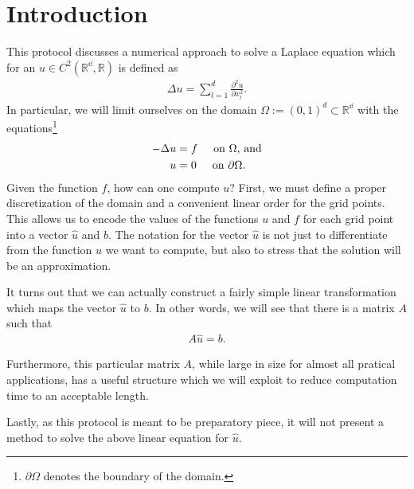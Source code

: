 \section{Introduction}

This protocol discusses a numerical approach to solve a Laplace equation which for an \(u \in C^2(\mathbb{R^d}, \mathbb{R})\) is defined as
\begin{align*}
	\Delta u = \sum^{d}_{l = 1} \frac{\partial^2 u}{\partial x_l^2} \text{.}
\end{align*}
In particular, we will limit ourselves on the domain \( \Omega := (0, 1)^d \subset \mathbb{R^d} \) with the equations\footnote{\(\partial \Omega\) denotes the boundary of the domain.}
\begin{align*}
	- \Delta u &= f \hspace{0.5cm} \text{on } \Omega \text{, and} \\
	u &= 0 \hspace{0.5cm} \text{on } \partial \Omega \text{.}
\end{align*}
Given the function \(f\), how can one compute \(u\)? First, we must define a proper discretization of the domain and a convenient linear order for the grid points. This allows us to encode the values of the functions \(u\) and \(f\) for each grid point into a vector \(\hat{u}\) and \(b\). The notation for the vector \(\hat{u}\) is not just to differentiate from the function \(u\) we want to compute, but also to stress that the solution will be an approximation.

It turns out that we can actually construct a fairly simple linear transformation which maps the vector \(\hat{u}\) to \(b\). In other words, we will see that there is a matrix \(A\) such that
\begin{align*}
	A \hat{u} = b \text{.}
\end{align*}

Furthermore, this particular matrix \(A\), while large in size for almost all pratical applications, has a useful structure which we will exploit to reduce computation time to an acceptable length.

Lastly, as this protocol is meant to be preparatory piece, it will not present a method to solve the above linear equation for \(\hat{u}\).